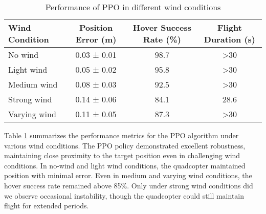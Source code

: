 \documentclass[12pt]{article}
\begin{document}

\begin{table}[htbp]
\centering
\caption{Performance of PPO in different wind conditions}
\begin{tabular}{lccc}
\toprule
Wind Condition & Position Error (m) & Hover Success Rate (\%) & Flight Duration (s) \\
\midrule
No wind & 0.03 ± 0.01 & 98.7 & >30 \\
Light wind & 0.05 ± 0.02 & 95.8 & >30 \\
Medium wind & 0.08 ± 0.03 & 92.5 & >30 \\
Strong wind & 0.14 ± 0.06 & 84.1 & 28.6 \\
Varying wind & 0.11 ± 0.05 & 87.3 & >30 \\
\bottomrule
\end{tabular}
\label{tab:wind_performance}
\end{table}


Table \ref{tab:wind_performance} summarizes the performance metrics for the PPO algorithm under various wind conditions. The PPO policy demonstrated excellent robustness, maintaining close proximity to the target position even in challenging wind conditions. In no-wind and light wind conditions, the quadcopter maintained position with minimal error. Even in medium and varying wind conditions, the hover success rate remained above 85\%. Only under strong wind conditions did we observe occasional instability, though the quadcopter could still maintain flight for extended periods.
\end{document}
